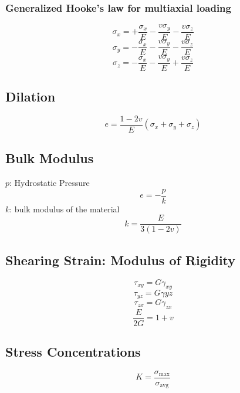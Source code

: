 \documentclass[10pt,landscape]{article}
\begin{document}
\begin{multicols}{3}
\subsubsection{Generalized Hooke's law for multiaxial loading}
\begin{equation}
    \sigma_x=+\frac{\sigma_x}{E}-\frac{v\sigma_y}{E}-\frac{v\sigma_z}{E}
\end{equation}
\begin{equation}
    \sigma_y=-\frac{\sigma_x}{E}-\frac{v\sigma_y}{E}-\frac{v\sigma_z}{E}
\end{equation}
\begin{equation}
    \sigma_z=-\frac{\sigma_x}{E}-\frac{v\sigma_y}{E}+\frac{v\sigma_z}{E}
\end{equation}
\subsection{Dilation}
\begin{equation}
    e=\frac{1-2v}{E}(\sigma_x+\sigma_y+\sigma_z)
\end{equation}
\subsection{Bulk Modulus}
$p$: Hydrostatic Pressure
\begin{equation}
    e=-\frac{p}{k}
\end{equation}
$k$: bulk modulus of the material
\begin{equation}
    k=\frac{E}{3(1-2v)}
\end{equation}
\subsection{Shearing Strain: Modulus of Rigidity}
\begin{equation}
    \tau_{xy}=G\gamma_{xy}
\end{equation}
\begin{equation}
    \tau_{yz}=G\gamma{yz}
\end{equation}
\begin{equation}
    \tau_{zx}=G\gamma_{zx}
\end{equation}
\begin{equation}
    \frac{E}{2G}=1+v
\end{equation}
\subsection{Stress Concentrations}
\begin{equation}
    K=\frac{\sigma_\text{max}}{\sigma_\text{avg}}
\end{equation}


\end{multicols}
\end{document}

